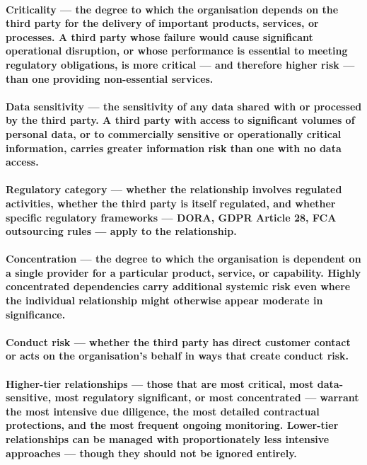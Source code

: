 \paragraph{Cri\textbf{t}icality — the degree to which the organisation depends on the third party for the delivery of important products, services, or processes. A third party whose failure would cause significant operational disruption, or whose performance is essential to meeting regulatory obligations, is more critical — and therefore higher risk — than one providing non-essential services.}
\paragraph{\textbf{Data sensitivity} — the sensitivity of any data shared with or processed by the third party. A third party with access to significant volumes of personal data, or to commercially sensitive or operationally critical information, carries greater information risk than one with no data access.}
\paragraph{\textbf{Regulatory category} — whether the relationship involves regulated activities, whether the third party is itself regulated, and whether specific regulatory frameworks — DORA, GDPR Article 28, FCA outsourcing rules — apply to the relationship.}
\paragraph{\textbf{Concentration} — the degree to which the organisation is dependent on a single provider for a particular product, service, or capability. Highly concentrated dependencies carry additional systemic risk even where the individual relationship might otherwise appear moderate in significance.}
\paragraph{\textbf{Conduct risk} — whether the third party has direct customer contact or acts on the organisation's behalf in ways that create conduct risk.}
\paragraph{Higher-tier relationships — those that are most critical, most data-sensitive, most regulatory significant, or most concentrated — warrant the most intensive due diligence, the most detailed contractual protections, and the most frequent ongoing monitoring. Lower-tier relationships can be managed with proportionately less intensive approaches — though they should not be ignored entirely.}


